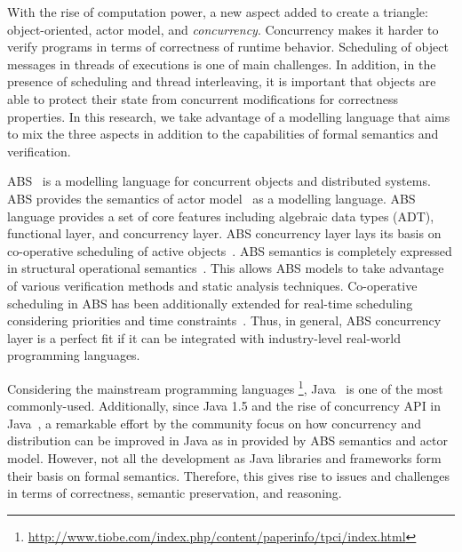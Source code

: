 With the rise of computation power, a new aspect added to create a triangle: object-oriented, actor model, and \emph{concurrency}.
Concurrency makes it harder to verify programs in terms of correctness of runtime behavior. 
Scheduling of object messages in threads of executions is one of main challenges.
In addition, in the presence of scheduling and thread interleaving, it is important that objects are able to protect their state from concurrent modifications for correctness properties.
In this research, we take advantage of a modelling language that aims to mix the three aspects in addition to the capabilities of formal semantics and verification.

ABS~\cite{johnsen2012abs,hahnlehjlssw11} is a modelling language for concurrent objects and distributed systems.
ABS provides the semantics of actor model~\cite{actors:agha} as a modelling language.
ABS language provides a set of core features including algebraic data types (ADT), functional layer, and concurrency layer.
ABS concurrency layer lays its basis on co-operative scheduling of active objects~\cite{creol:broch:owe}.
ABS semantics is completely expressed in structural operational semantics~\cite{plotkin:sos}.
This allows ABS models to take advantage of various verification methods and static analysis techniques.
% 
Co-operative scheduling in ABS has been additionally extended for real-time scheduling considering priorities and time constraints~\cite{bjork2013:rtabs,johnsen2012modeling}.
Thus, in general, ABS concurrency layer is a perfect fit if it can be integrated with industry-level real-world programming languages.

Considering the mainstream programming languages
\footnote{\url{http://www.tiobe.com/index.php/content/paperinfo/tpci/index.html}}, Java~\cite{gosling2000java} is one of the most commonly-used.
Additionally, since Java 1.5 and the rise of concurrency API in Java~\cite{jsr166}, a remarkable effort by the community focus on how concurrency and distribution can be improved in Java as in provided by ABS semantics and actor model.
However, not all the development as Java libraries and frameworks form their basis on formal semantics. 
Therefore, this gives rise to issues and challenges in terms of correctness, semantic preservation, and reasoning.

